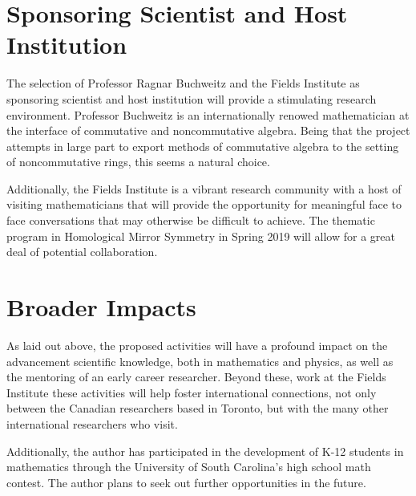 \documentclass[11pt]{article}
\begin{document}
\section{Sponsoring Scientist and Host Institution}
The selection of Professor Ragnar Buchweitz and the Fields Institute as sponsoring scientist and host institution will provide a stimulating research environment.
Professor Buchweitz is an internationally renowed mathematician at the interface of commutative and noncommutative algebra.
Being that the project attempts in large part to export methods of commutative algebra to the setting of noncommutative rings, this seems a natural choice.

Additionally, the Fields Institute is a vibrant research community with a host of visiting mathematicians that will provide the opportunity for meaningful face to face conversations that may otherwise be difficult to achieve.
The thematic program in Homological Mirror Symmetry in Spring 2019 will allow for a great deal of potential collaboration.

\section{Broader Impacts}

As laid out above, the proposed activities will have a profound impact on the advancement scientific knowledge, both in mathematics and physics, as well as the mentoring of an early career researcher.
Beyond these, work at the Fields Institute these activities will help foster international connections, not only between the Canadian researchers based in Toronto, but with the many other international researchers who visit.

Additionally, the author has participated in the development of K-12 students in mathematics through the University of South Carolina's high school math contest.
The author plans to seek out further opportunities in the future.


\setcounter{page}{1}

\end{document}

